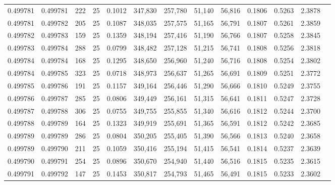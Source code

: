 \begin{tabular}{rrrrrrrrrrrrr}
0.499781 & 0.499781 & 222 &  25 &                                     0.1012 & 347,830 & 257,780 &  51,140 &  56,816 & 0.1806 & 0.5263 & 2.3878 \\
0.499781 & 0.499782 & 205 &  25 &                                     0.1087 & 348,035 & 257,575 &  51,165 &  56,791 & 0.1807 & 0.5261 & 2.3859 \\
0.499782 & 0.499783 & 159 &  25 &                                     0.1359 & 348,194 & 257,416 &  51,190 &  56,766 & 0.1807 & 0.5258 & 2.3845 \\
0.499783 & 0.499784 & 288 &  25 &                                     0.0799 & 348,482 & 257,128 &  51,215 &  56,741 & 0.1808 & 0.5256 & 2.3818 \\
0.499784 & 0.499784 & 168 &  25 &                                     0.1295 & 348,650 & 256,960 &  51,240 &  56,716 & 0.1808 & 0.5254 & 2.3802 \\
0.499784 & 0.499785 & 323 &  25 &                                     0.0718 & 348,973 & 256,637 &  51,265 &  56,691 & 0.1809 & 0.5251 & 2.3772 \\
0.499785 & 0.499786 & 191 &  25 &                                     0.1157 & 349,164 & 256,446 &  51,290 &  56,666 & 0.1810 & 0.5249 & 2.3755 \\
0.499786 & 0.499787 & 285 &  25 &                                     0.0806 & 349,449 & 256,161 &  51,315 &  56,641 & 0.1811 & 0.5247 & 2.3728 \\
0.499787 & 0.499788 & 306 &  25 &                                     0.0755 & 349,755 & 255,855 &  51,340 &  56,616 & 0.1812 & 0.5244 & 2.3700 \\
0.499788 & 0.499789 & 164 &  25 &                                     0.1323 & 349,919 & 255,691 &  51,365 &  56,591 & 0.1812 & 0.5242 & 2.3685 \\
0.499789 & 0.499789 & 286 &  25 &                                     0.0804 & 350,205 & 255,405 &  51,390 &  56,566 & 0.1813 & 0.5240 & 2.3658 \\
0.499789 & 0.499790 & 211 &  25 &                                     0.1059 & 350,416 & 255,194 &  51,415 &  56,541 & 0.1814 & 0.5237 & 2.3639 \\
0.499790 & 0.499791 & 254 &  25 &                                     0.0896 & 350,670 & 254,940 &  51,440 &  56,516 & 0.1815 & 0.5235 & 2.3615 \\
0.499791 & 0.499792 & 147 &  25 &                                     0.1453 & 350,817 & 254,793 &  51,465 &  56,491 & 0.1815 & 0.5233 & 2.3602 \\

\end{tabular}
